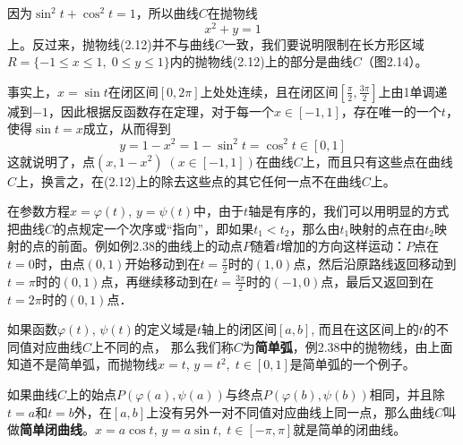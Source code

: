 \begin{solution}
因为$\sin^2 t+\cos^2 t=1 $，所以曲线$C$在抛物线
\begin{equation}
    x^2+y=1
\end{equation}
上。反过来，抛物线(2.12)并不与曲线$C$一致，我们要说明限制在长方形区域$R=\{-1\le x\le 1,\; 0\le y\le 1\}$内的抛物线(2.12)上的部分是曲线$C$（图2.14）。

\begin{figure}[htp]
    \centering
{}
    \caption{}
\end{figure}

事实上，$x=\sin t$在闭区间$[0,2\pi]$上处处连续，且在闭区间$\left[\frac{\pi}{2},\frac{3\pi}{2}\right]$上由1单调递减到$-1$，因此根据反函数存在定理，对于每一个$x\in[-1,1]$，存在唯一的一个$t$，使得$\sin t=x$成立，从而得到
\[y=1-x^2=1-\sin^2 t=\cos^2 t\in [0,1]\]
这就说明了，点$(x,1-x^2)\; (x\in [-1, 1])$在曲线$C$上，而且只有这些点在曲线$C$上，换言之，在(2.12)上的除去这些点的其它任何一点不在曲线$C$上。
\end{solution}

在参数方程$x=\varphi(t)$, $y=\psi(t)$中，由于$t$轴是有序的，我们可以用明显的方式把曲线$C$的点规定一个次序或“指向”，即如果$t_1<t_2$，那么由$t_1$映射的点在由$t_2$映射的点的前面。例如例2.38的曲线上的动点$P$随着$t$增加的方向这样运动：$P$点在$t=0$时，由点$(0,1)$开始移动到在$t=\frac{\pi}{2}$时的$(1,0)$点，然后沿原路线返回移动到$t=\pi$时的$(0,1)$点，再继续移动到在$t=\frac{3\pi}{2}$时的$(-1, 0)$点，最后又返回到在$t=2\pi$时的$(0, 1)$点．

如果函数$\varphi(t)$, $\psi(t)$的定义域是$t$轴上的闭区间$[a,b]$, 而且在这区间上的$t$的不同值对应曲线$C$上不同的点，
那么我们称$C$为\textbf{简单弧}，例2.38中的抛物线，由上面知道不是简单弧，而抛物线$x=t$, $y=t^2,\; t\in [0, 1]$是简单弧的一个例子。

如果曲线$C$上的始点$P(\varphi(a),\psi(a))$与终点$P(\varphi(b),\psi(b))$相同，并且除$t=a$和$t=b$外，在$[a,b]$上没有另外一对不同值对应曲线上同一点，那么曲线$C$叫做\textbf{简单闭曲线}。$x=a\cos t$, $y=a\sin t,\; t\in [-\pi,\pi]$就是简单的闭曲线。

